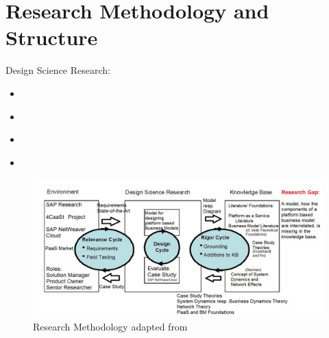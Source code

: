 \section{Research Methodology and Structure}

Design Science Research:
\begin{itemize}
	\item \citet{March1995}
	\item \citet{Hevner2004}
	\item \citet{Hevner2007}
	\item \citet{Peffers2007}
\end{itemize}

\begin{figure}[htb]
	\centering
	\includegraphics[width=\textwidth]{gfx/researchMethodology}
	\caption[Research Methodology]{Research Methodology adapted from \citet{Hevner2007}}
	\label{fig:rm}
\end{figure}
